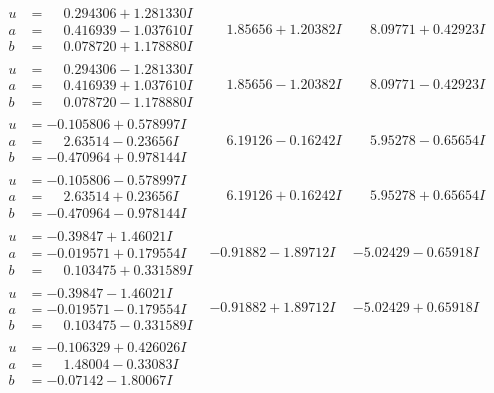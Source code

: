 \documentclass[1p]{elsarticle_modified}
\theoremstyle{definition}
\begin{document}
$$\begin{array}{c|c|c}
\begin{aligned}
u &= \phantom{-}0.294306 + 1.281330 I \\
a &= \phantom{-}0.416939 - 1.037610 I \\
b &= \phantom{-}0.078720 + 1.178880 I\end{aligned}
 & \phantom{-}1.85656 + 1.20382 I & \phantom{-}8.09771 + 0.42923 I \\ \hline\begin{aligned}
u &= \phantom{-}0.294306 - 1.281330 I \\
a &= \phantom{-}0.416939 + 1.037610 I \\
b &= \phantom{-}0.078720 - 1.178880 I\end{aligned}
 & \phantom{-}1.85656 - 1.20382 I & \phantom{-}8.09771 - 0.42923 I \\ \hline\begin{aligned}
u &= -0.105806 + 0.578997 I \\
a &= \phantom{-}2.63514 - 0.23656 I \\
b &= -0.470964 + 0.978144 I\end{aligned}
 & \phantom{-}6.19126 - 0.16242 I & \phantom{-}5.95278 - 0.65654 I \\ \hline\begin{aligned}
u &= -0.105806 - 0.578997 I \\
a &= \phantom{-}2.63514 + 0.23656 I \\
b &= -0.470964 - 0.978144 I\end{aligned}
 & \phantom{-}6.19126 + 0.16242 I & \phantom{-}5.95278 + 0.65654 I \\ \hline\begin{aligned}
u &= -0.39847 + 1.46021 I \\
a &= -0.019571 + 0.179554 I \\
b &= \phantom{-}0.103475 + 0.331589 I\end{aligned}
 & -0.91882 - 1.89712 I & -5.02429 - 0.65918 I \\ \hline\begin{aligned}
u &= -0.39847 - 1.46021 I \\
a &= -0.019571 - 0.179554 I \\
b &= \phantom{-}0.103475 - 0.331589 I\end{aligned}
 & -0.91882 + 1.89712 I & -5.02429 + 0.65918 I \\ \hline\begin{aligned}
u &= -0.106329 + 0.426026 I \\
a &= \phantom{-}1.48004 - 0.33083 I \\
b &= -0.07142 - 1.80067 I\end{aligned}

\end{array}$$
\end{document}
